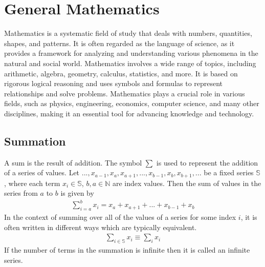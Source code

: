 \chapter{General Mathematics}
\thispagestyle{fancy}

Mathematics is a systematic field of study that deals with numbers, quantities, shapes, and patterns. It is often regarded as the language of science, as it provides a framework for analyzing and understanding various phenomena in the natural and social world. Mathematics involves a wide range of topics, including arithmetic, algebra, geometry, calculus, statistics, and more. It is based on rigorous logical reasoning and uses symbols and formulas to represent relationships and solve problems. Mathematics plays a crucial role in various fields, such as physics, engineering, economics, computer science, and many other disciplines, making it an essential tool for advancing knowledge and technology.


\section{Summation}

\begin{defn}
	A sum is the result of addition. The symbol $\sum$ is used to represent the addition of a series of values. Let $..., x_{a-1}, x_a, x_{a+1}, ... ,x_{b-1}, x_b, x_{b+1}, ...$ be a fixed series $\mathbb{S}$, where each term $x_i\in\mathbb{S}$, $b, a \in \mathbb{N}$ are index values. Then the sum of values in the series from $a$ to $b$ is given by
	\begin{align}
		\sum_{i=a}^{b} x_i = x_a +  x_{a+1} + ... + x_{b-1} + x_b
	\end{align}
	In the context of summing over all of the values of a series for some index $i$, it is often written in different ways which are typically equivalent.
	\begin{align}
		\sum_{i\in\mathbb{S}} x_i \equiv \sum_{i} x_i
	\end{align}
	If the number of terms in the summation is infinite then it is called an infinite series.
\end{defn}

